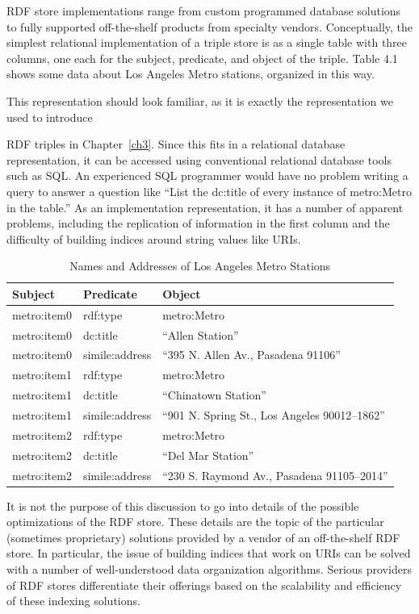 RDF store implementations range from custom programmed database
solutions to fully supported off-the-shelf products from specialty
vendors. Conceptually, the simplest relational implementation of a
triple store is as a single table with three columns, one each for the
subject, predicate, and object of the triple. Table 4.1 shows some data
about Los Angeles Metro stations, organized in this way.

This representation should look familiar, as it is exactly the
representation we used to introduce

RDF triples in Chapter~\ref{ch3}. Since this fits in a relational database
representation, it can be accessed using conventional relational
database tools such as SQL. An experienced SQL programmer would have no
problem writing a query to answer a question like ``List the dc:title of
every instance of metro:Metro in the table.'' As an implementation
representation, it has a number of apparent problems, including the replication of information in the first column
and the difficulty of building indices around string values like URIs.

\begin{table}[h]
\centering
\begin{tabular}{||l l l ||} 
 \hline
 Subject&Predicate&Object \\ [0.5ex] 
 \hline\hline
metro:item0&rdf:type&metro:Metro \\
metro:item0&dc:title&``Allen Station'' \\
metro:item0&simile:address&``395 N. Allen Av., Pasadena 91106'' \\
metro:item1&rdf:type&metro:Metro \\
metro:item1&dc:title&``Chinatown Station'' \\
metro:item1&simile:address&``901 N. Spring St., Los Angeles 90012--1862'' \\
metro:item2&rdf:type&metro:Metro \\
metro:item2&dc:title&``Del Mar Station'' \\
metro:item2&simile:address&``230 S. Raymond Av., Pasadena 91105--2014'' \\
\hline
\end{tabular}
\caption{Names and Addresses of Los Angeles Metro Stations}
\label{tab:ch3.14}
\end{table}





It is not the purpose of this discussion to go into details of the
possible optimizations of the RDF store. These details are the topic of
the particular (sometimes proprietary) solutions provided by a vendor of
an off-the-shelf RDF store. In particular, the issue of building indices
that work on URIs can be solved with a number of well-understood data
organization algorithms. Serious providers of RDF stores differentiate
their offerings based on the scalability and efficiency of these
indexing solutions.

